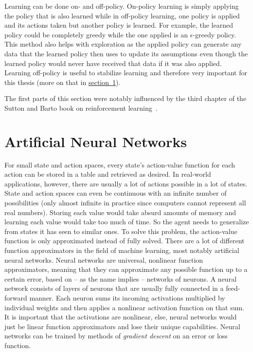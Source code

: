 \documentclass[a4paper,titlepage]{article}
\begin{document}
Learning can be done on- and off-policy. On-policy learning is simply applying the policy that is also learned while in off-policy learning, one policy is applied and its actions taken but another policy is learned. For example, the learned policy could be completely greedy while the one applied is an $\epsilon$-greedy policy. This method also helps with exploration as the applied policy can generate any data that the learned policy then uses to update its assumptions even though the learned policy would never have received that data if it was also applied. Learning off-policy is useful to stabilize learning and therefore very important for this thesis (more on that in \hyperref[sec:anns]{section~\ref*{sec:anns}}). \medskip

The first parts of this section were notably influenced by the third chapter of the Sutton and Barto book on reinforcement learning~\cite{book}.

\newpage

\section{Artificial Neural Networks}
\label{sec:anns}

For small state and action spaces, every state's action-value function for each action can be stored in a table and retrieved as desired. In real-world applications, however, there are usually a lot of actions possible in a lot of states. State and action spaces can even be continuous with an infinite number of possibilities (only almost infinite in practice since computers cannot represent all real numbers). Storing each value would take absurd amounts of memory and learning each value would take too much of time. So the agent needs to generalize from states it has seen to similar ones. To solve this problem, the action-value function is only approximated instead of fully solved. There are a lot of different function approximators in the field of machine learning, most notably artificial neural networks. Neural networks are universal, nonlinear function approximators, meaning that they can approximate any possible function up to a certain error, based on -- as the name implies -- networks of neurons. A neural network consists of layers of neurons that are usually fully connected in a feed-forward manner. Each neuron sums its incoming activations multiplied by individual weights and then applies a nonlinear activation function on that sum.  %
It is important that the activations are nonlinear, else, neural networks would just be linear function approximators and lose their unique capabilities.
Neural networks can be trained by methods of \emph{gradient descent} on an error or loss function.
\end{document}
